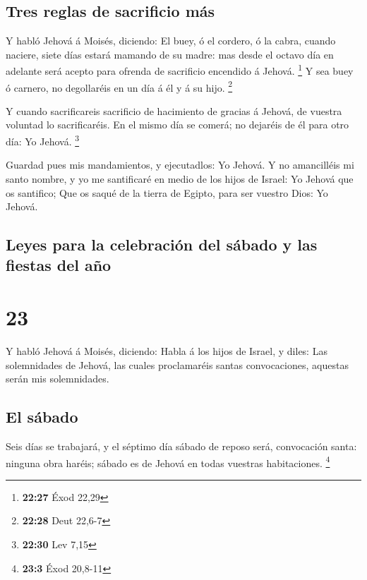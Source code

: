 \hypertarget{tres-reglas-de-sacrificio-muxe1s}{%
\subsection{Tres reglas de sacrificio
más}\label{tres-reglas-de-sacrificio-muxe1s}}

 Y habló Jehová á Moisés, diciendo:  El buey,
ó el cordero, ó la cabra, cuando naciere, siete días estará mamando de
su madre: mas desde el octavo día en adelante será acepto para ofrenda
de sacrificio encendido á Jehová. \footnote{\textbf{22:27} Éxod 22,29}
 Y sea buey ó carnero, no degollaréis en un día á él y á su
hijo. \footnote{\textbf{22:28} Deut 22,6-7}

 Y cuando sacrificareis sacrificio de hacimiento de gracias
á Jehová, de vuestra voluntad lo sacrificaréis.  En el
mismo día se comerá; no dejaréis de él para otro día: Yo Jehová.
\footnote{\textbf{22:30} Lev 7,15}

 Guardad pues mis mandamientos, y ejecutadlos: Yo Jehová.
 Y no amancilléis mi santo nombre, y yo me santificaré en
medio de los hijos de Israel: Yo Jehová que os santifico; 
Que os saqué de la tierra de Egipto, para ser vuestro Dios: Yo Jehová.

\hypertarget{leyes-para-la-celebraciuxf3n-del-suxe1bado-y-las-fiestas-del-auxf1o}{%
\subsection{Leyes para la celebración del sábado y las fiestas del
año}\label{leyes-para-la-celebraciuxf3n-del-suxe1bado-y-las-fiestas-del-auxf1o}}

\hypertarget{section-22}{%
\section{23}\label{section-22}}

 Y habló Jehová á Moisés, diciendo:  Habla á los
hijos de Israel, y diles: Las solemnidades de Jehová, las cuales
proclamaréis santas convocaciones, aquestas serán mis solemnidades.

\hypertarget{el-suxe1bado}{%
\subsection{El sábado}\label{el-suxe1bado}}

 Seis días se trabajará, y el séptimo día sábado de reposo
será, convocación santa: ninguna obra haréis; sábado es de Jehová en
todas vuestras habitaciones. \footnote{\textbf{23:3} Éxod 20,8-11}

